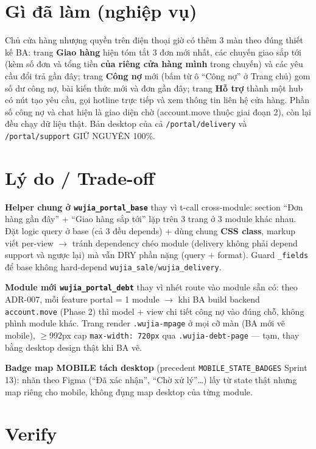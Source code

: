 \section{Gì đã làm (nghiệp vụ)}

Chủ cửa hàng nhượng quyền trên điện thoại giờ có thêm 3 màn theo đúng thiết kế BA:
trang \textbf{Giao hàng} hiện tóm tắt 3 đơn mới nhất, các chuyến giao sắp tới (kèm số
đơn và tổng tiền \textbf{của riêng cửa hàng mình} trong chuyến) và các yêu cầu đổi trả
gần đây; trang \textbf{Công nợ} mới (bấm từ ô ``Công nợ'' ở Trang chủ) gom số dư công nợ,
bài kiến thức mới và đơn gần đây; trang \textbf{Hỗ trợ} thành một hub có nút tạo yêu cầu,
gọi hotline trực tiếp và xem thông tin liên hệ cửa hàng. Phần số công nợ và chat hiện
là giao diện chờ (account.move thuộc giai đoạn 2), còn lại đều chạy dữ liệu thật.
Bản desktop của cả \texttt{/portal/delivery} và \texttt{/portal/support} GIỮ NGUYÊN
100\%.

\section{Lý do / Trade-off}

\textbf{Helper chung ở \texttt{wujia\_portal\_base}} thay vì t-call cross-module: section
``Đơn hàng gần đây'' + ``Giao hàng sắp tới'' lặp trên 3 trang ở 3 module khác nhau.
Đặt logic query ở base (cả 3 đều depends) + dùng chung \textbf{CSS class}, markup viết
per-view \(\rightarrow\) tránh dependency chéo module (delivery không phải depend support
và ngược lại) mà vẫn DRY phần nặng (query + format). Guard \texttt{\_fields} để base
không hard-depend \texttt{wujia\_sale}/\texttt{wujia\_delivery}.

\textbf{Module mới \texttt{wujia\_portal\_debt}} thay vì nhét route vào module sẵn có:
theo ADR-007, mỗi feature portal = 1 module \(\rightarrow\) khi BA build backend
\texttt{account.move} (Phase 2) thì model + view chi tiết công nợ vào đúng chỗ, không
phình module khác. Trang render \texttt{.wujia-mpage} ở mọi cỡ màn (BA mới vẽ mobile),
\(\geq\)992px cap \texttt{max-width: 720px} qua \texttt{.wujia-debt-page} --- tạm, thay
bằng desktop design thật khi BA vẽ.

\textbf{Badge map MOBILE tách desktop} (precedent \texttt{MOBILE\_STATE\_BADGES} Sprint
13): nhãn theo Figma (``Đã xác nhận'', ``Chờ xử lý''\ldots) lấy từ state thật nhưng map
riêng cho mobile, không đụng map desktop của từng module.

\section{Verify}

